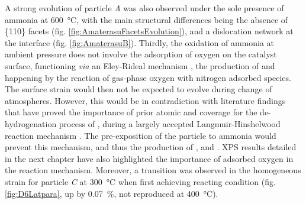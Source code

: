 A strong evolution of particle \textit{A} was also observed under the sole presence of ammonia at \qty{600}{\degreeCelsius}, with the main structural differences being the absence of \{110\} facets (fig. \ref{fig:AmaterasuFacetsEvolution}), and a dislocation network at the interface (fig. \ref{fig:AmaterasuB}).
Thirdly, the oxidation of ammonia at ambient pressure does not involve the adsorption of oxygen on the catalyst surface, functioning \textit{via} an Eley-Rideal mechanism \parencite{Rideal1939}, the production of  and  happening by the reaction of gas-phase oxygen with nitrogen adsorbed species.
The surface strain would then not be expected to evolve during change of atmospheres.
However, this would be in contradiction with literature findings that have proved the importance of prior atomic  and  coverage for the de-hydrogenation process of , during a largely accepted Langmuir-Hinshelwood reaction mechanism \parencite{Bradley1995, Mieher1995,vandenBroek1999, Kim2000}.
The pre-exposition of the particle to ammonia would prevent this mechanism, and thus the production of ,  and .
XPS results detailed in the next chapter have also highlighted the importance of adsorbed oxygen in the reaction mechanism.
Moreover, a transition was observed in the homogeneous strain for particle \textit{C} at \qty{300}{\degreeCelsius} when first achieving reacting condition (fig. \ref{fig:D6Latpara}, up by \qty{0.07}{\percent}, not reproduced at \qty{400}{\degreeCelsius}).


